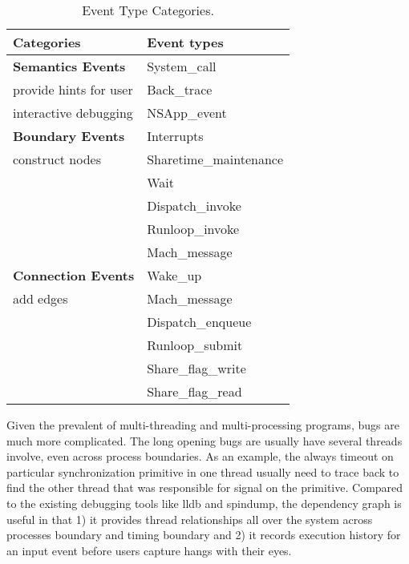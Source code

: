 \begin{table}[h]
  \centering
  \begin{tabularx}{\columnwidth}{|X|X|}
  	\hline
    \textbf{Categories} & \textbf{Event types}\\
	\hline
	\hline
    {\bf Semantics Events} & System\_call\\
    provide hints for user & Back\_trace\\					   
	interactive debugging  & NSApp\_event\\
    \hline
    {\bf Boundary Events} & Interrupts\\
	construct nodes & Sharetime\_maintenance\\
	& Wait\\
	& Dispatch\_invoke\\
    & Runloop\_invoke\\
	& Mach\_message\\
    \hline
	{\bf Connection Events} & Wake\_up\\
    add edges & Mach\_message\\
    & Dispatch\_enqueue\\
    & Runloop\_submit\\
	& Share\_flag\_write\\
	& Share\_flag\_read\\
    \hline
  \end{tabularx}
  \caption{Event Type Categories. }
  \label{table:event_types}
\end{table}

Given the prevalent of multi-threading and multi-processing programs, bugs are
much more complicated. The long opening bugs are usually have several threads
involve, even across process boundaries. As an example, the always timeout on
particular synchronization primitive in one thread usually need to trace back to
find the other thread that was responsible for signal on the primitive. Compared
to the existing debugging tools like lldb and spindump, the dependency graph is
useful in that 1) it provides thread relationships all over the system across
processes boundary and timing boundary and 2) it records execution history for
an input event before users capture hangs with their eyes.

